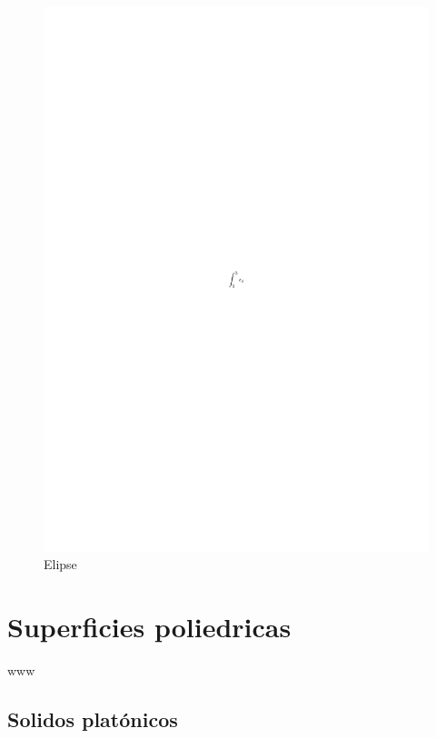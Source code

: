 \documentclass[
  16pt,
]{krantz}
\theoremstyle{definition}
\theoremstyle{definition}
\theoremstyle{definition}
\theoremstyle{definition}
\theoremstyle{remark}
\begin{document}
\begin{figure}[!ht]

{\centering \includegraphics{dibujo} 

}

\caption{Elipse}\label{fig:pressure1}
\end{figure}

\hypertarget{superficies-poliedricas}{%
\section{Superficies poliedricas}\label{superficies-poliedricas}}

www

\hypertarget{solidos-platuxf3nicos}{%
\subsection{Solidos platónicos}\label{solidos-platuxf3nicos}}
\end{document}
